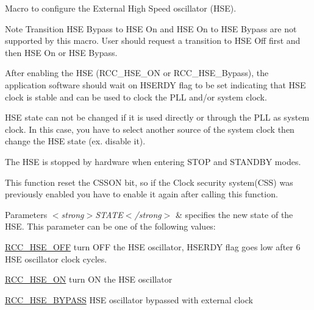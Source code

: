 Macro to configure the External High Speed oscillator (H\-S\-E). 

\begin{DoxyNote}{Note}
Transition H\-S\-E Bypass to H\-S\-E On and H\-S\-E On to H\-S\-E Bypass are not supported by this macro. User should request a transition to H\-S\-E Off first and then H\-S\-E On or H\-S\-E Bypass. 

After enabling the H\-S\-E (R\-C\-C\-\_\-\-H\-S\-E\-\_\-\-O\-N or R\-C\-C\-\_\-\-H\-S\-E\-\_\-\-Bypass), the application software should wait on H\-S\-E\-R\-D\-Y flag to be set indicating that H\-S\-E clock is stable and can be used to clock the P\-L\-L and/or system clock. 

H\-S\-E state can not be changed if it is used directly or through the P\-L\-L as system clock. In this case, you have to select another source of the system clock then change the H\-S\-E state (ex. disable it). 

The H\-S\-E is stopped by hardware when entering S\-T\-O\-P and S\-T\-A\-N\-D\-B\-Y modes. 

This function reset the C\-S\-S\-O\-N bit, so if the Clock security system(\-C\-S\-S) was previously enabled you have to enable it again after calling this function. 
\end{DoxyNote}

\begin{DoxyParams}{Parameters}
{\em $<$strong$>$\-S\-T\-A\-T\-E$<$/strong$>$} & specifies the new state of the H\-S\-E. This parameter can be one of the following values\-: \begin{DoxyItemize}
\item \hyperlink{group___r_c_c___h_s_e___config_ga1616626d23fbce440398578855df6f97}{R\-C\-C\-\_\-\-H\-S\-E\-\_\-\-O\-F\-F} turn O\-F\-F the H\-S\-E oscillator, H\-S\-E\-R\-D\-Y flag goes low after 6 H\-S\-E oscillator clock cycles. \item \hyperlink{group___r_c_c___h_s_e___config_gabc4f70a44776c557af20496b04d9a9db}{R\-C\-C\-\_\-\-H\-S\-E\-\_\-\-O\-N} turn O\-N the H\-S\-E oscillator \item \hyperlink{group___r_c_c___h_s_e___config_ga5ca515db2d5c4d5bdb9ee3d154df2704}{R\-C\-C\-\_\-\-H\-S\-E\-\_\-\-B\-Y\-P\-A\-S\-S} H\-S\-E oscillator bypassed with external clock \end{DoxyItemize}
\\
\hline
\end{DoxyParams}
